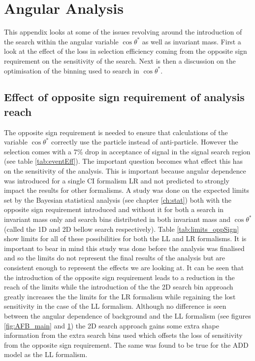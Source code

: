 \chapter{Angular Analysis}

This appendix looks at some of the issues revolving around the introduction of the search within the angular variable $\cos{\theta^{*}}$ as well as invariant mass. First a look at the effect of the loss in selection efficiency coming from the opposite sign requirement on the sensitivity of the search. Next is then a discussion on the optimisation of the binning used to search in $\cos{\theta^{*}}$.

\section{Effect of opposite sign requirement of analysis reach}
	\label{sec:oppSign}

	The opposite sign requirement is needed to ensure that calculations of the variable $\cos{\theta^{*}}$  correctly use the particle instead of anti-particle. However the selection comes with a 7\% drop in acceptance of signal in the signal search region (see table \ref{tab:eventEff}). The important question becomes what effect this has on the sensitivity of the analysis. This is important because angular dependence was introduced for a single CI formalism LR and not predicted to strongly impact the results for other formalisms. 
	A study was done on the expected limits set by the Bayesian statistical analysis (see chapter \ref{ch:stat}) both with the opposite sign requirement introduced and without it for both a search in invariant mass only and search bins distributed in both invariant mass and $\cos{\theta^{*}}$ (called the 1D and 2D bellow search respectively). Table \ref{tab:limits_oppSign} show limits for all of these possibilities for both the LL and LR formalisms. It is important to bear in mind this study was done before the analysis was finalised and so the limits do not represent the final results of the analysis but are consistent enough to represent the effects we are looking at. It can be seen that the introduction of the opposite sign requirement leads to a reduction in the reach of the limits while the introduction of the the 2D search bin approach greatly increases the the limits for the LR formalism while regaining the lost sensitivity in the case of the LL formalism. Although no difference is seen between the angular dependence of background and the LL formalism (see figures \ref{fig:AFB_main} and \ref{}) the 2D search approach gains some extra shape information from the extra search bins used which offsets the loss of sensitivity from the opposite sign requirement. The same was found to be true for the ADD model as the LL formalism.  


